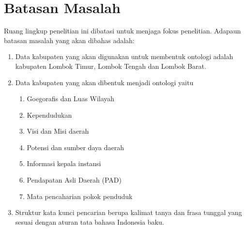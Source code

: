 \section{Batasan Masalah}
Ruang lingkup penelitian ini dibatasi untuk menjaga fokus penelitian. Adapaun batasan masalah yang akan dibahas adalah:
\begin{enumerate}
	\item Data kabupaten yang akan digunakan untuk membentuk ontologi adalah kabupaten Lombok Timur, Lombok Tengah dan Lombok Barat.
	\item Data kabupaten yang akan dibentuk menjadi ontologi yaitu
	\begin{enumerate}
		\item Goegorafis dan Luas Wilayah
		\item Kependudukan 
		\item Visi dan Misi daerah
		\item Potensi dan sumber daya daerah 
		\item Informasi kepala instansi
		\item Pendapatan Asli Daerah (PAD)
		\item Mata pencaharian pokok penduduk
	\end{enumerate}
	\item Struktur kata kunci pencarian berupa kalimat tanya dan frasa tunggal yang sesuai dengan aturan tata bahasa Indonesia baku.
\end{enumerate}